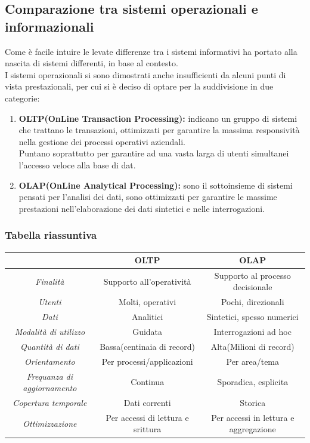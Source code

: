 \documentclass{book}
\begin{document}
    \subsection{Comparazione tra sistemi operazionali e informazionali}
    Come è facile intuire le levate differenze tra i sistemi informativi ha portato alla nascita di sistemi differenti, in base al contesto.\\
    I sistemi operazionali si sono dimostrati anche insufficienti da alcuni punti di vista prestazionali, per cui si è deciso di optare per la suddivisione in due categorie:
    \begin{enumerate}
        \item \textbf{OLTP(OnLine Transaction Processing):} indicano un gruppo di sistemi che trattano le transazioni, ottimizzati per garantire la massima responsività nella gestione dei processi operativi aziendali.\\
            Puntano soprattutto per garantire ad una vasta larga di utenti simultanei l'accesso veloce alla base di dat.
        \item \textbf{OLAP(OnLine Analytical Processing):} sono il sottoinsieme di sistemi pensati per l'analisi dei dati, sono ottimizzati per garantire le massime prestazioni nell'elaborazione dei dati sintetici e nelle interrogazioni.
    \end{enumerate}

    \subsubsection{Tabella riassuntiva}

    \begin{center}
        \begin{tabular}{|c|c|c|}
            \hline
            & \textbf{OLTP} & \textbf{OLAP}\\
            \hline
            \textit{Finalità} & Supporto all'operatività & Supporto al processo decisionale\\
            \hline
            \textit{Utenti} & Molti, operativi & Pochi, direzionali\\
            \hline
            \textit{Dati} & Analitici & Sintetici, spesso numerici\\
            \hline
            \textit{Modalità di utilizzo} & Guidata & Interrogazioni ad hoc\\
            \hline
            \textit{Quantità di dati} & Bassa(centinaia di record) & Alta(Milioni di record)\\
            \hline
            \textit{Orientamento} & Per processi/applicazioni & Per area/tema\\
            \hline
            \textit{Frequanza di aggiornamento} & Continua & Sporadica, esplicita\\
            \hline
            \textit{Copertura temporale} & Dati correnti & Storica\\
            \hline
            \textit{Ottimizzazione} & Per accessi di lettura e srittura & Per accessi in lettura e aggregazione\\
            \hline
        \end{tabular}
    \end{center}
\end{document}
